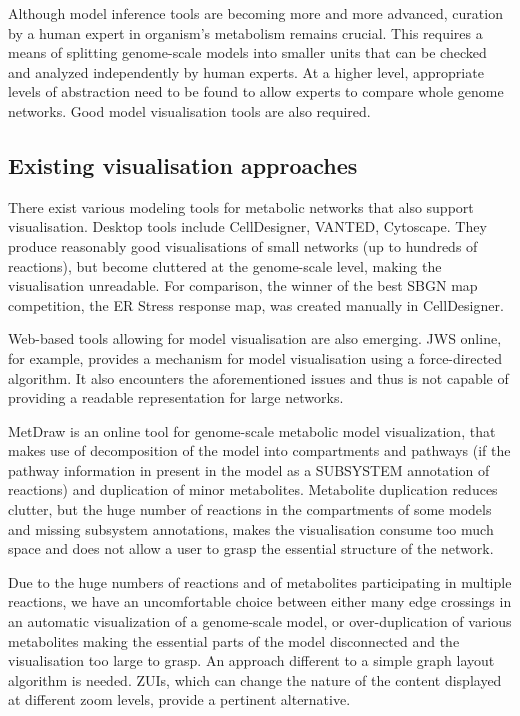 \documentclass{bmcart}
\begin{document}
Although  model inference tools are becoming more and more advanced, curation by a human expert in organism's metabolism remains crucial. This requires a means of splitting genome-scale models into smaller units that can be checked and analyzed independently by human experts. At a higher level, appropriate levels of abstraction need to be found to allow experts to compare whole genome networks. Good model visualisation tools are also required.

\subsection*{Existing visualisation approaches}
There exist various modeling tools for metabolic networks that also support visualisation. Desktop tools include CellDesigner\cite{Funahashi2008}, VANTED\cite{Rohn2012}, Cytoscape\cite{Smoot2011}. They produce reasonably good visualisations of small networks (up to hundreds of reactions), but become cluttered at the genome-scale level, making the visualisation unreadable. For comparison, the winner of the best SBGN map competition\cite{SBGN}, the ER Stress response\cite{Groenendyk2010} map,  was created manually in CellDesigner.

Web-based tools allowing for model visualisation are also emerging.  JWS online\cite{Snoep2003}, for example, provides a mechanism for model visualisation using a force-directed algorithm. It also encounters the aforementioned issues and thus is not capable of providing a readable representation for large networks.  

MetDraw\cite{Jensen2014} is an online tool for genome-scale metabolic model visualization, that makes use of decomposition of the model into compartments and pathways (if the pathway information in present in the model as a SUBSYSTEM annotation of reactions) and duplication of minor metabolites. Metabolite duplication reduces clutter, but the huge number of reactions in the compartments of some models and missing subsystem annotations, makes the visualisation consume too much space and does not allow a user to grasp the essential structure of the network.

Due to the huge numbers of reactions and of metabolites participating in multiple reactions, we have an uncomfortable choice between either many edge crossings in an automatic visualization of a genome-scale model, or over-duplication of various metabolites making the essential parts of the model disconnected and the visualisation too large to grasp. An approach different to a simple graph layout algorithm is needed. ZUIs, which can change the nature of the content displayed at different zoom levels, provide a pertinent alternative.
\end{document}
